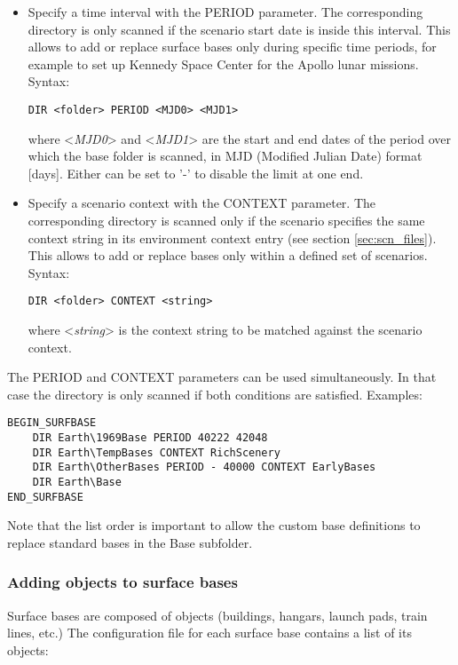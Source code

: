 \documentclass[Orbiter Developer Manual.tex]{subfiles}
\begin{document}
\begin{itemize}
\item Specify a time interval with the PERIOD parameter. The corresponding directory is only scanned if the scenario start date is inside this interval. This allows to add or replace surface bases only during specific time periods, for example to set up Kennedy Space Center for the Apollo lunar missions. Syntax:

\begin{lstlisting}[language=OSFS]
DIR <folder> PERIOD <MJD0> <MJD1>
\end{lstlisting}

\noindent
where <\textit{MJD0}> and <\textit{MJD1}> are the start and end dates of the period over which the base folder is scanned, in MJD (Modified Julian Date) format [days]. Either can be set to '-' to disable the limit at one end.
\item Specify a scenario context with the CONTEXT parameter. The corresponding directory is scanned only if the scenario specifies the same context string in its environment context entry (see section \ref{sec:scn_files}). This allows to add or replace bases only within a defined set of scenarios. Syntax:

\begin{lstlisting}[language=OSFS]
DIR <folder> CONTEXT <string>
\end{lstlisting}

\noindent
where <\textit{string}> is the context string to be matched against the scenario context.
\end{itemize}

\noindent
The PERIOD and CONTEXT parameters can be used simultaneously. In that case the directory is only scanned if both conditions are satisfied. Examples:
\begin{lstlisting}[language=OSFS]
BEGIN_SURFBASE
	DIR Earth\1969Base PERIOD 40222 42048
	DIR Earth\TempBases CONTEXT RichScenery
	DIR Earth\OtherBases PERIOD - 40000 CONTEXT EarlyBases
	DIR Earth\Base
END_SURFBASE
\end{lstlisting}

\noindent
Note that the list order is important to allow the custom base definitions to replace standard bases in the Base subfolder.


\subsubsection*{Adding objects to surface bases}
Surface bases are composed of objects (buildings, hangars, launch pads, train lines, etc.) The configuration file for each surface base contains a list of its objects:
\end{document}
